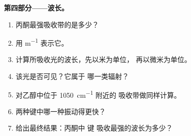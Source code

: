 \begin{problem}
\medskip
\noindent\textbf{第四部分——波长。}
\begin{enumerate}[resume]
  \item 丙酮最强吸收带的是多少？
  \item 用 \si{m^{-1}} 表示它。
  \item 计算所吸收光的波长，先以米为单位，
        再以微米为单位。
  \item 该光是否可见？它属于
        哪一类辐射？
  \item 对乙醇中位于
        \qty{1050}{cm^{-1}} 附近的  吸收带做同样计算。
  \item 两种键中哪一种振动得更快？
  \item 给出最终结果：丙酮中  键
        吸收最强的波长为多少？
\end{enumerate}
\end{problem}
